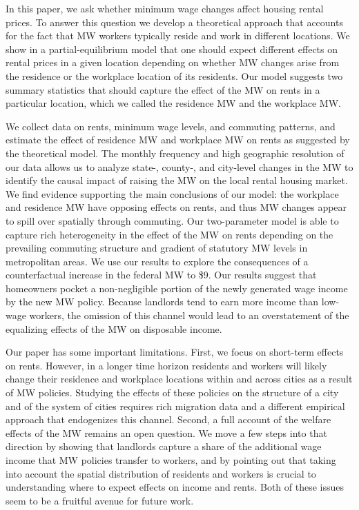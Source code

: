
In this paper, we ask whether minimum wage changes affect housing rental prices.
To answer this question we develop a theoretical approach that accounts for
the fact that MW workers typically reside and work in different locations.
We show in a partial-equilibrium model that one should expect different effects
on rental prices in a given location depending on whether MW changes arise from 
the residence or the workplace location of its residents.
Our model suggests two summary statistics that should capture the effect of 
the MW on rents in a particular location, which we called the residence MW and 
the workplace MW.

We collect data on rents, minimum wage levels, and commuting patterns, and
estimate the effect of residence MW and workplace MW on rents as suggested by
the theoretical model.
The monthly frequency and high geographic resolution of our data allows us to 
analyze state-, county-, and city-level changes in the MW to identify the causal 
impact of raising the MW on the local rental housing market.
We find evidence supporting the main conclusions of our model: the workplace and 
residence MW have opposing effects on rents, and thus MW changes appear to 
spill over spatially through commuting.
Our two-parameter model is able to capture rich heterogeneity in the effect 
of the MW on rents depending on the prevailing commuting structure and 
gradient of statutory MW levels in metropolitan areas.
We use our results to explore the consequences of a counterfactual increase 
in the federal MW to \$9.
Our results suggest that homeowners pocket a non-negligible portion of the newly 
generated wage income by the new MW policy.
Because landlords tend to earn more income than low-wage workers,
the omission of this channel would lead to an overstatement of the equalizing 
effects of the MW on disposable income.

Our paper has some important limitations.
First, we focus on short-term effects on rents.
However, in a longer time horizon residents and workers will likely change 
their residence and workplace locations within and across cities as a result 
of MW policies.
Studying the effects of these policies on the structure of a city and of the 
system of cities requires rich migration data and a different empirical approach
that endogenizes this channel.
Second, a full account of the welfare effects of the MW remains an open question.
We move a few steps into that direction by showing that landlords capture a 
share of the additional wage income that MW policies transfer to workers, and 
by pointing out that taking into account the spatial distribution of residents 
and workers is crucial to understanding where to expect effects on income and 
rents.
Both of these issues seem to be a fruitful avenue for future work.
